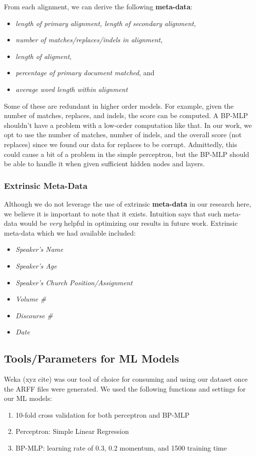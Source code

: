 From each alignment, we can derive the following \textbf{meta-data}:
	\begin{itemize}
		\item \textit{length of primary alignment, length of secondary alignment},
		\item \textit{number of matches/replaces/indels in alignment},
		\item \textit{length of aligment},
		\item \textit{percentage of primary document matched}, and
		\item \textit{average word length within alignment}
	\end{itemize}

Some of these are redundant in higher order models. For example, given the number of matches, replaces, and indels, the score can be computed. A BP-MLP shouldn't have a problem with a low-order computation like that. In our work, we opt to use the number of matches, number of indels, and the overall score (not replaces) since we found our data for replaces to be corrupt. Admittedly, this could cause a bit of a problem in the simple perceptron, but the BP-MLP should be able to handle it when given sufficient hidden nodes and layers.

\subsubsection{Extrinsic Meta-Data}
Although we do not leverage the use of extrinsic \textbf{meta-data} in our research here, we believe it is important to note that it exists. Intuition says that such meta-data would be \textit{very} helpful in optimizing our results in future work. Extrinsic meta-data which we had available included:
	\begin{itemize}
		\item \textit{Speaker's Name}
		\item \textit{Speaker's Age}
		\item \textit{Speaker's Church Position/Assignment}
		\item \textit{Volume \#}
		\item \textit{Discourse \#}
		\item \textit{Date}
	\end{itemize}

\subsection{Tools/Parameters for ML Models}
Weka (xyz cite) was our tool of choice for consuming and using our dataset once the ARFF files were generated. We used the following functions and settings for our ML models:
\begin{enumerate}
	\item 10-fold cross validation for both perceptron and BP-MLP
	\item Perceptron: Simple Linear Regression
	\item BP-MLP: learning rate of 0.3, 0.2 momentum, and 1500 training time
\end{enumerate}

